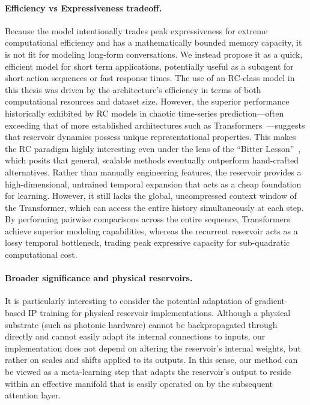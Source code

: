 \documentclass{sapthesis}
\begin{document}
\paragraph{Efficiency vs Expressiveness tradeoff.} Because the model intentionally trades peak expressiveness for extreme computational efficiency and has a mathematically bounded memory capacity, it is not fit for modeling long-form conversations. We instead propose it as a quick, efficient model for short term applications, potentially useful as a subagent for short action sequences or fast response times.
The use of an RC-class model in this thesis was driven by the architecture's efficiency in terms of both computational resources and dataset size. However, the superior performance historically exhibited by RC models in chaotic time-series prediction—often exceeding that of more established architectures such as Transformers~\cite{vaswani2023attentionneed}—suggests that reservoir dynamics possess unique representational properties. This makes the RC paradigm highly interesting even under the lens of the ``Bitter Lesson''~\cite{sutton2019bitterlesson}, which posits that general, scalable methods eventually outperform hand-crafted alternatives. Rather than manually engineering features, the reservoir provides a high-dimensional, untrained temporal expansion that acts as a cheap foundation for learning. However, it still lacks the global, uncompressed context window of the Transformer, which can access the entire history simultaneously at each step. By performing pairwise comparisons across the entire sequence, Transformers achieve superior modeling capabilities, whereas the recurrent reservoir acts as a lossy temporal bottleneck, trading peak expressive capacity for sub-quadratic computational cost.

\paragraph{Broader significance and physical reservoirs.}
It is particularly interesting to consider the potential adaptation of gradient-based IP training for physical reservoir implementations. Although a physical substrate (such as photonic hardware) cannot be backpropagated through directly and cannot easily adapt its internal connections to inputs, our implementation does not depend on altering the reservoir's internal weights, but rather on scales and shifts applied to its outputs. In this sense, our method can be viewed as a meta-learning step that adapts the reservoir's output to reside within an effective manifold that is easily operated on by the subsequent attention layer.
\end{document}
